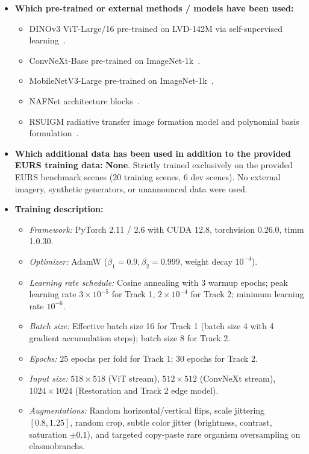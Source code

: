 \documentclass{article}
\begin{document}
\begin{itemize}[leftmargin=*]
\item \textbf{Which pre-trained or external methods / models have been used:}
  \begin{itemize}
    \item DINOv3 ViT-Large/16 pre-trained on LVD-142M via self-supervised learning~\cite{oquab2023dinov2}.
    \item ConvNeXt-Base pre-trained on ImageNet-1k~\cite{liu2022convnet}.
    \item MobileNetV3-Large pre-trained on ImageNet-1k~\cite{howard2019mobilenetv3}.
    \item NAFNet architecture blocks~\cite{chen2022nafnet}.
    \item RSUIGM radiative transfer image formation model and polynomial basis formulation~\cite{desai2024rsuigm}.
  \end{itemize}
\item \textbf{Which additional data has been used in addition to the provided EURS training data:} \textbf{None}. Strictly trained exclusively on the provided EURS benchmark scenes (20 training scenes, 6 dev scenes). No external imagery, synthetic generators, or unannounced data were used.
\item \textbf{Training description:}
  \begin{itemize}
    \item \emph{Framework:} PyTorch 2.11 / 2.6 with CUDA 12.8, torchvision 0.26.0, timm 1.0.30.
    \item \emph{Optimizer:} AdamW ($\beta_1=0.9, \beta_2=0.999$, weight decay $10^{-4}$).
    \item \emph{Learning rate schedule:} Cosine annealing with 3 warmup epochs; peak learning rate $3\times10^{-5}$ for Track 1, $2\times10^{-4}$ for Track 2; minimum learning rate $10^{-6}$.
    \item \emph{Batch size:} Effective batch size 16 for Track 1 (batch size 4 with 4 gradient accumulation steps); batch size 8 for Track 2.
    \item \emph{Epochs:} 25 epochs per fold for Track 1; 30 epochs for Track 2.
    \item \emph{Input size:} $518\times518$ (ViT stream), $512\times512$ (ConvNeXt stream), $1024\times1024$ (Restoration and Track 2 edge model).
    \item \emph{Augmentations:} Random horizontal/vertical flips, scale jittering $[0.8, 1.25]$, random crop, subtle color jitter (brightness, contrast, saturation $\pm0.1$), and targeted copy-paste rare organism oversampling on elasmobranchs.

\end{itemize}
\end{itemize}
\end{document}
